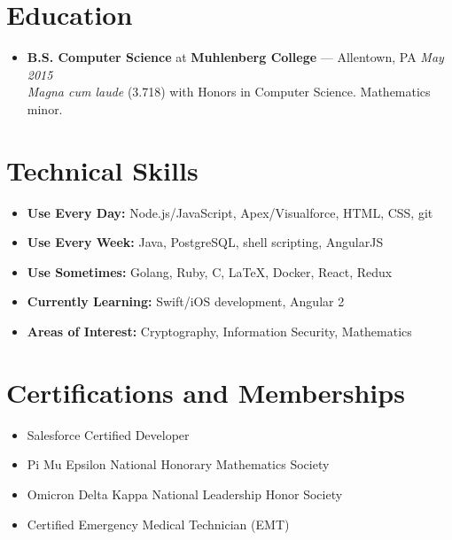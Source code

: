 \documentclass[11pt]{article}
\begin{document}
\section*{Education}
\begin{itemize}
  \item \textbf{B.S. Computer Science} at \textbf{Muhlenberg College} --- Allentown, PA \hfill {\em May 2015} \\
  {\em Magna cum laude} (3.718) with Honors in Computer Science. Mathematics minor.
\end{itemize}



\section*{Technical Skills}
\begin{itemize}
  \item \textbf{Use Every Day:} Node.js/JavaScript, Apex/Visualforce, HTML, CSS, git
  \item \textbf{Use Every Week:} Java, PostgreSQL, shell scripting, AngularJS
  \item \textbf{Use Sometimes:} Golang, Ruby, C, LaTeX, Docker, React, Redux
  \item \textbf{Currently Learning:} Swift/iOS development, Angular 2
  \item \textbf{Areas of Interest:} Cryptography, Information Security, Mathematics
\end{itemize}



\section*{Certifications and Memberships}
\begin{itemize}
  \item Salesforce Certified Developer
  \item Pi Mu Epsilon National Honorary Mathematics Society
  \item Omicron Delta Kappa National Leadership Honor Society
  \item Certified Emergency Medical Technician (EMT)
\end{itemize}
\end{document}
